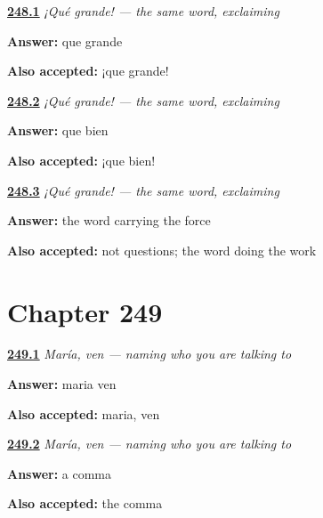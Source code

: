 \noindent\begin{minipage}[t]{\linewidth}
\raggedright
\hyperlink{review-ES-C64-que-grande-say}{\textbf{248.1}} \emph{¡Qué grande! — the same word, exclaiming}\par
\small \textbf{Answer:} que grande\par
\footnotesize \textbf{Also accepted:} ¡que grande!
\end{minipage}\par\medskip

\noindent\begin{minipage}[t]{\linewidth}
\raggedright
\hyperlink{review-ES-C64-que-grande-good}{\textbf{248.2}} \emph{¡Qué grande! — the same word, exclaiming}\par
\small \textbf{Answer:} que bien\par
\footnotesize \textbf{Also accepted:} ¡que bien!
\end{minipage}\par\medskip

\noindent\begin{minipage}[t]{\linewidth}
\raggedright
\hyperlink{review-ES-C64-que-grande-accent}{\textbf{248.3}} \emph{¡Qué grande! — the same word, exclaiming}\par
\small \textbf{Answer:} the word carrying the force\par
\footnotesize \textbf{Also accepted:} not questions; the word doing the work
\end{minipage}\par\medskip

\section*{Chapter 249}

\noindent\begin{minipage}[t]{\linewidth}
\raggedright
\hyperlink{review-ES-C64-maria-ven-say}{\textbf{249.1}} \emph{María, ven — naming who you are talking to}\par
\small \textbf{Answer:} maria ven\par
\footnotesize \textbf{Also accepted:} maria, ven
\end{minipage}\par\medskip

\noindent\begin{minipage}[t]{\linewidth}
\raggedright
\hyperlink{review-ES-C64-maria-ven-mark}{\textbf{249.2}} \emph{María, ven — naming who you are talking to}\par
\small \textbf{Answer:} a comma\par
\footnotesize \textbf{Also accepted:} the comma
\end{minipage}\par\medskip

